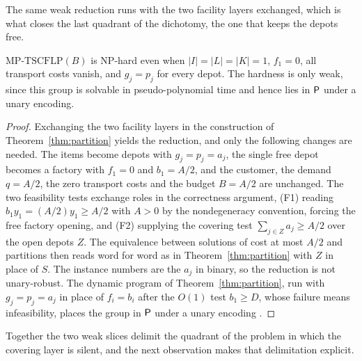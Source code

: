 The same weak reduction runs with the two facility layers exchanged, which is
what closes the last quadrant of the dichotomy, the one that keeps the depots
free.

\begin{corollary}\label{cor:partitionmirror}
$\mathrm{MP\text{-}TSCFLP}(B)$ is NP-hard even when $|I|=|L|=|K|=1$, $f_1=0$, all
transport costs vanish, and $g_j=p_j$ for every depot. The hardness is only weak,
since this group is solvable in pseudo-polynomial time and hence lies in
$\textsf{P}$ under a unary encoding.
\end{corollary}
\begin{proof}
Exchanging the two facility layers in the construction of
Theorem~\ref{thm:partition} yields the reduction, and only the
following changes are needed. The items become depots with $g_j=p_j=a_j$, the single
free depot becomes a factory with $f_1=0$ and $b_1=A/2$, and the
customer, the demand $q=A/2$, the zero transport costs and the budget
$B=A/2$ are unchanged. The two feasibility tests exchange
roles in the correctness argument, (F1) reading $b_1y_1=(A/2)y_1\ge A/2$ with $A>0$ by
the nondegeneracy convention, forcing the free factory opening, and
(F2) supplying the covering test $\sum_{j\in Z}a_j\ge A/2$ over the
open depots $Z$. The equivalence between solutions of cost at most
$A/2$ and partitions then reads word for word as in
Theorem~\ref{thm:partition} with $Z$ in place of $S$. The instance
numbers are the $a_j$ in binary, so the reduction is not unary-robust.
The dynamic program of Theorem~\ref{thm:partition}, run with
$g_j=p_j=a_j$ in place of $f_i=b_i$ after the $O(1)$ test $b_1\ge D$,
whose failure means infeasibility,
places the group in $\textsf{P}$ under a unary encoding \citep{GareyJohnson1979}.
\end{proof}

Together the two weak slices delimit the quadrant of the problem in which
the covering layer is silent, and the next observation makes that
delimitation explicit.

